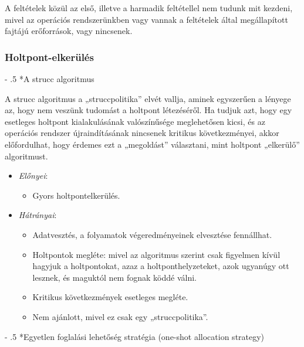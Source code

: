 \documentclass[tikz,12pt,margin=0px]{article}
\makeatletter
\renewcommand\paragraph{%
	\@startsection{paragraph}{4}{0mm}%
	{-\baselineskip}%
	{.5\baselineskip}%
	{\normalfont\normalsize\bfseries}}
\makeatother
\begin{document}
    \noindent A feltételek közül az első, illetve a harmadik feltétellel nem tudunk mit kezdeni, mivel az operációs rendszerünkben vagy vannak a feltételek által megállapított fajtájú erőforrások, vagy nincsenek.

    \subsubsection*{Holtpont-elkerülés}

    \paragraph*{A strucc algoritmus}

    A strucc algoritmus a „struccpolitika” elvét vallja, aminek egyszerűen a lényege az, hogy nem veszünk tudomást a holtpont létezéséről. Ha tudjuk azt, hogy egy esetleges holtpont kialakulásának valószínűsége meglehetősen kicsi, és az operációs rendszer újraindításának nincsenek kritikus következményei, akkor előfordulhat, hogy érdemes ezt a „megoldást” választani, mint holtpont „elkerülő” algoritmust.

    \begin{itemize}[topsep=8pt,itemsep=4pt,partopsep=4pt, parsep=4pt]
        \item \emph{Előnyei}:
        \begin{itemize}
            \item Gyors holtpontelkerülés.
        \end{itemize}
        \item \emph{Hátrányai}:
            \begin{itemize}
                \item Adatvesztés, a folyamatok végeredményeinek elvesztése fennállhat.
                \item Holtpontok megléte: mivel az algoritmus szerint csak figyelmen kívül hagyjuk a holtpontokat, azaz a holtponthelyzeteket, azok ugyanúgy ott lesznek, és maguktól nem fognak köddé válni.
                \item Kritikus következmények esetleges megléte.
                \item Nem ajánlott, mivel ez csak egy „struccpolitika”.
            \end{itemize}
    \end{itemize}

    \paragraph*{Egyetlen foglalási lehetőség stratégia (one-shot allocation strategy)}
\end{document}

